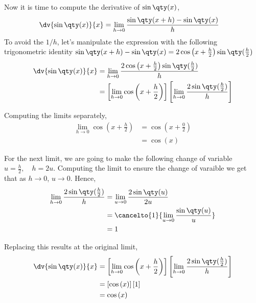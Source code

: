 \documentclass[../main-notes.tex]{subfile}
\begin{document}
Now it is time to compute the derivative of \(\sin\qty(x)\),
\begin{align*}
    \dv{\sin\qty(x)}{x} &= \lim_{h\to 0}\frac{\sin\qty(x+h) - \sin\qty(x)}{h} 
\end{align*}
To avoid the $1/h$, let's manipulate the expression with the following trigonometric identity \( \sin\qty(x+h) - \sin\qty(x) = 2\cos\left(x+\frac{h}{2}\right)\sin\qty(\frac{h}{2}) \)
\begin{align*}
    \dv{\sin\qty(x)}{x} &= \lim_{h\to 0}\frac{2\cos\left(x+\frac{h}{2}\right)\sin\qty(\frac{h}{2})}{h} \\
                        &=\left[ \lim_{h\to 0}\cos\left(x+\frac{h}{2}\right)\right]\left[ \lim_{h\to 0}\frac{2\sin\qty(\frac{h}{2})}{h}\right] 
\end{align*}

Computing the limits separately,
\begin{align*}
    \lim_{h\to 0}\cos\left(x+\frac{h}{2}\right) &= \cos\left(x+\frac{0}{2}\right) \\
                                                &= \cos\left(x\right)
\end{align*}

For the next limit, we are going to make the following change of variable \( u = \frac{h}{2},\quad h = 2u \).
Computing the limit to ensure the change of varaible we get that as $h\to0$, $u\to0$.
Hence,
\begin{align*}
    \lim_{h\to 0}\frac{2\sin\qty(\frac{h}{2})}{h} &= \lim_{u\to 0}\frac{2\sin\qty(u)}{2u} \\
                                                  &= \cancelto{1}{\lim_{u\to 0}\frac{\sin\qty(u)}{u}} \\
                                                  &= 1
\end{align*}

Replacing this results at the original limit,
\begin{align*}
    \dv{\sin\qty(x)}{x} &=\left[ \lim_{h\to 0}\cos\left(x+\frac{h}{2}\right)\right]\left[ \lim_{h\to 0}\frac{2\sin\qty(\frac{h}{2})}{h}\right] \\
                        &= \left[ \cos\left(x\right)\right]\left[1 \right] \\
                        &= \cos\left(x\right)
\end{align*}
\end{document}

